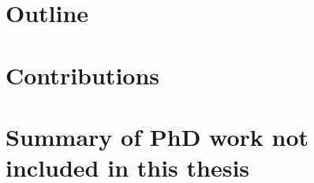 \section{Outline}

\section{Contributions}

\section{Summary of PhD work not included in this thesis}





















